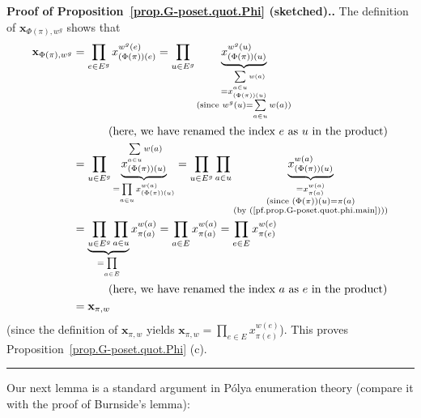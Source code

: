 \documentclass[numbers=enddot,12pt,final,onecolumn,notitlepage,abstracton]{scrartcl}
\theoremstyle{definition}
\newenvironment{proof}[1][Proof]{\noindent\textbf{#1.} }{\ \rule{0.5em}{0.5em}}
\let\sumnonlimits\sum
\let\prodnonlimits\prod
\renewcommand{\sum}{\sumnonlimits\limits}
\renewcommand{\prod}{\prodnonlimits\limits}
\newenvironment{verlong}{}{}
\newcommand{\xx}{{\mathbf{x}}}
\begin{document}
\begin{proof}[Proof of Proposition~\ref{prop.G-poset.quot.Phi} (sketched).]
\begin{verlong}
The definition of $\xx_{\Phi\left(  \pi\right)  ,w^{g}}$ shows that
\begin{align*}
\xx_{\Phi\left(  \pi\right)  ,w^{g}}
&= \prod_{e\in E^{g}}
 x_{\left( \Phi\left(  \pi\right)  \right)  \left(  e\right)  }^{
    w^{g}\left(  e\right) }
= \prod_{u\in E^{g}}
 \underbrace{x_{\left(  \Phi\left(  \pi\right)  \right)
    \left(  u\right)  }^{w^{g}\left(  u\right)  }}_{
    \substack{= x_{\left(  \Phi\left(  \pi\right) \right) \left( u
    \right) }^{\sum_{a \in u} w \left( a \right) } \\
    \text{(since }
    w^{g}\left(  u\right) = \sum\limits_{a\in u}w\left(  a\right)
    \text{)}}}
\\
&\ \ \ \ \ \ \ \ \ 
\left(\text{here, we have renamed the index } e \text{ as } u
\text{ in the product}\right) \\
&= \prod_{u\in E^{g}}
 \underbrace{x_{\left(  \Phi\left(  \pi\right)  \right)
    \left(  u\right)  }^{ \sum_{a \in u} w \left( a \right) }}_{
    \substack{=\prod_{a\in u}x_{\left(  \Phi\left(  \pi\right) 
    \right)  \left(  u\right)  }^{w\left( a\right)  }}}
= \prod_{u\in E^{g}} \prod_{a\in u}
  \underbrace{x_{\left(  \Phi\left(  \pi\right)  \right) 
    \left(  u\right) }^{w\left(  a\right)  }}_{
    \substack{=x_{\pi\left(  a\right)  }^{w\left( a\right)  }\\
    \text{(since } \left( \Phi \left( \pi \right) \right) \left(
    u \right) = \pi \left( a \right) \\
    \text{(by (\ref{pf.prop.G-poset.quot.phi.main})))}}}\\
&= \underbrace{\prod_{u\in E^{g}}\prod_{a\in u}}_{=\prod_{a\in E}}
  x_{\pi\left(  a\right)  }^{w\left(  a\right)  }
= \prod_{a\in E}x_{\pi\left( a\right)  }^{w\left(  a\right)  }
= \prod_{e\in E}x_{\pi\left(  e\right) }^{w\left(  e\right)  } \\
&\ \ \ \ \ \ \ \ \ 
\left(\text{here, we have renamed the index } a \text{ as } e
\text{ in the product}\right) \\
&= \xx_{\pi,w}%
\end{align*}
(since the definition of $\xx_{\pi,w}$ yields
$\xx_{\pi, w}
= \prod_{e\in E}x_{\pi\left(  e\right) }^{w\left(  e\right)  }$).
This proves Proposition~\ref{prop.G-poset.quot.Phi} (c).
\end{verlong}
\end{proof}

Our next lemma is a standard argument in P\'olya enumeration theory (compare
it with the proof of Burnside's lemma):
\end{document}
